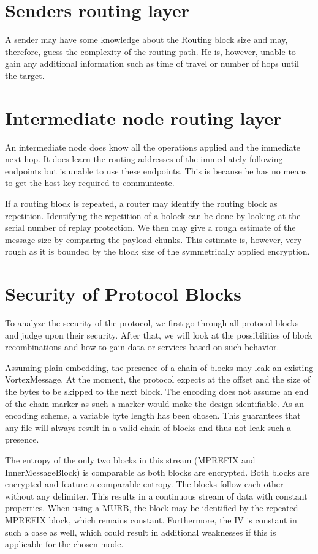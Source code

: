 \section{Senders routing layer}
A sender may have some knowledge about the Routing block size and may, therefore, guess the complexity of the routing path. He is, however, unable to gain any additional information such as time of travel or number of hops until the target.

\section{Intermediate node routing layer}
An intermediate node does know all the operations applied and the immediate next hop. It does learn the routing addresses of the immediately following endpoints but is unable to use these endpoints. This is because he has no means to get the host key required to communicate.

If a routing block is repeated, a router may identify the routing block as repetition. Identifying the repetition of a bolock can be done by looking at the serial number of replay protection. We then may give a rough estimate of the message size by comparing the payload chunks. This estimate is, however, very rough as it is bounded by the block size of the symmetrically applied encryption.

\section{Security of Protocol Blocks}
To analyze the security of the protocol, we first go through all protocol blocks and judge upon their security. After that, we will look at the possibilities of block recombinations and how to gain data or services based on such behavior. 

Assuming plain embedding, the presence of a chain of blocks may leak an existing VortexMessage. At the moment, the protocol expects at the offset and the size of the bytes to be skipped to the next block. The encoding does not assume an end of the chain marker as such a marker would make the design identifiable. As an encoding scheme, a variable byte length has been chosen. This guarantees that any file will always result in a valid chain of blocks and thus not leak such a presence.

The entropy of the only two blocks in this stream (MPREFIX and InnerMessageBlock) is comparable as both blocks are encrypted. Both blocks are encrypted and feature a comparable entropy. The blocks follow each other without any delimiter. This results in a continuous stream of data with constant properties. When using a MURB, the block may be identified by the repeated MPREFIX block, which remains constant. Furthermore, the IV is constant in such a case as well, which could result in additional weaknesses if this is applicable for the chosen mode. 

